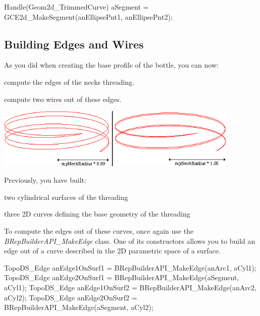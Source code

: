 \begin{DoxyCode}
Handle(Geom2d\_TrimmedCurve) aSegment = GCE2d\_MakeSegment(anEllipsePnt1, anEllipsePnt2);
\end{DoxyCode}
\hypertarget{occt__tutorial_OCCT_TUTORIAL_SUB4_3}{}\subsection{Building Edges and Wires}\label{occt__tutorial_OCCT_TUTORIAL_SUB4_3}
As you did when creating the base profile of the bottle, you can now\+:


\begin{DoxyItemize}
\item compute the edges of the neck\textquotesingle{}s threading.
\item compute two wires out of these edges.
\end{DoxyItemize}


\begin{DoxyImageNoCaption}
\begin{center}
   \mbox{\includegraphics[width=440]{tutorial_image017.png}}
\end{center}
\end{DoxyImageNoCaption}


Previously, you have built\+:


\begin{DoxyItemize}
\item two cylindrical surfaces of the threading
\item three 2D curves defining the base geometry of the threading
\end{DoxyItemize}

To compute the edges out of these curves, once again use the {\itshape B\+Rep\+Builder\+A\+P\+I\+\_\+\+Make\+Edge} class. One of its constructors allows you to build an edge out of a curve described in the 2D parametric space of a surface.


\begin{DoxyCode}
TopoDS\_Edge anEdge1OnSurf1 = BRepBuilderAPI\_MakeEdge(anArc1, aCyl1);
TopoDS\_Edge anEdge2OnSurf1 = BRepBuilderAPI\_MakeEdge(aSegment, aCyl1);
TopoDS\_Edge anEdge1OnSurf2 = BRepBuilderAPI\_MakeEdge(anArc2, aCyl2);
TopoDS\_Edge anEdge2OnSurf2 = BRepBuilderAPI\_MakeEdge(aSegment, aCyl2);
\end{DoxyCode}


